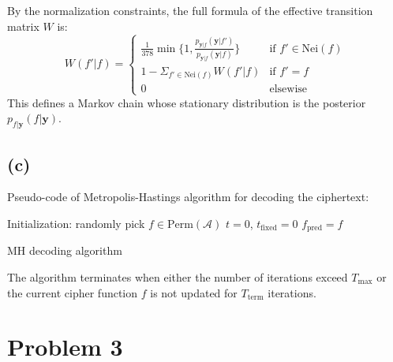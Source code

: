 \documentclass[12pt]{article}
\begin{document}
By the normalization constraints, the full formula of the effective transition matrix $W$ is:
\begin{equation}
W(f'|f) =
\begin{cases}
\frac{1}{378}\min\big\{1, \frac{p_{\mathbf{y}|f}(\mathbf{y}|f')}{p_{\mathbf{y}|f}(\mathbf{y}|f)}\big\} & \text{if }f'\in \text{Nei}(f)\\ 1-\Sigma_{f'\in\text{Nei}(f)}W(f'|f) & \text{if }f'=f\\0 & \text{elsewise}
\end{cases}
\end{equation}
This defines a Markov chain whose stationary distribution is the posterior $p_{f|\mathbf{y}}(f|\mathbf{y})$.

\subsection{(c)}
Pseudo-code of Metropolis-Hastings algorithm for decoding the ciphertext:

\begin{algorithm}[H]
	Initialization: randomly pick $f\in \text{Perm}(\mathcal{A})$\;
	$t=0$, $t_{\text{fixed}}=0$\;
	$f_{\text{pred}} = f$\;
\caption{MH decoding algorithm}
\end{algorithm}

The algorithm terminates when either the number of iterations exceed $T_\text{max}$ or the current cipher function $f$ is not updated for $T_\text{term}$ iterations.


\section{Problem 3}
\end{document}
